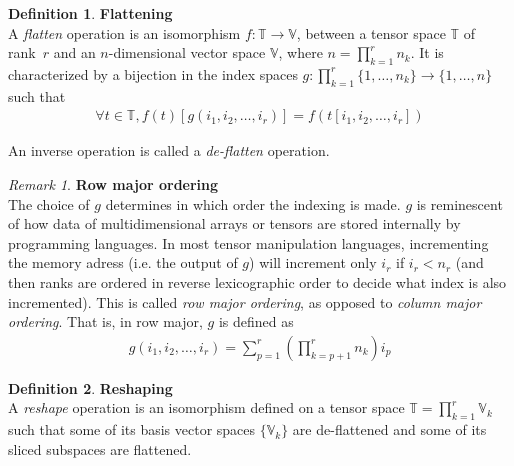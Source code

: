 \documentclass{article}
\theoremstyle{definition}
\newtheorem{definition}{Definition}[section]
\theoremstyle{remark}
\newtheorem{remark}{Remark}[section]
\theoremstyle{plain}
\newcommand{\tspace}{\mathbb{T}}
\newcommand{\vecspace}{\mathbb{V}}
\begin{document}
\begin{definition}\textbf{Flattening}\\
A \emph{flatten} operation is an isomorphism $f: \tspace \rightarrow \vecspace$, between a tensor space $\tspace$ of rank~$r$ and an $n$-dimensional vector space $\vecspace$, where $n =\displaystyle \prod_{k=1}^r n_k$. It is characterized by a bijection in the index spaces $g: \displaystyle \prod_{k=1}^r \{1, \ldots, n_k \} \rightarrow\{1, \ldots, n \}$ such that
\begin{gather*}
  \forall t \in \tspace, f(t)[g(i_1, i_2, \ldots, i_r)] = f(t[i_1, i_2, \ldots, i_r])
\end{gather*}

An inverse operation is called a \emph{de-flatten} operation.
\end{definition}

\begin{remark}\textbf{Row major ordering}\\
The choice of $g$ determines in which order the indexing is made. $g$ is reminescent of how data of multidimensional arrays or tensors are stored internally by programming languages. In most tensor manipulation languages, incrementing the memory adress (i.e. the output of $g$) will increment only $i_r$ if $i_r < n_r$ (and then ranks are ordered in reverse lexicographic order to decide what index is also incremented). This is called \emph{row major ordering}, as opposed to \emph{column major ordering}. That is, in row major, $g$ is defined as
\begin{align}
  g(i_1, i_2, \ldots, i_r) = \displaystyle \sum_{p=1}^r \left( \prod_{k=p+1}^r n_k \right) i_p \label{rowmajor}
\end{align}
\end{remark}

\begin{definition}\textbf{Reshaping}\\
A \emph{reshape} operation is an isomorphism defined on a tensor space $\tspace = \displaystyle \prod_{k=1}^r \vecspace_k$ such that some of its basis vector spaces $\{\vecspace_k\}$ are de-flattened and some of its sliced subspaces are flattened.
\end{definition}
\end{document}
